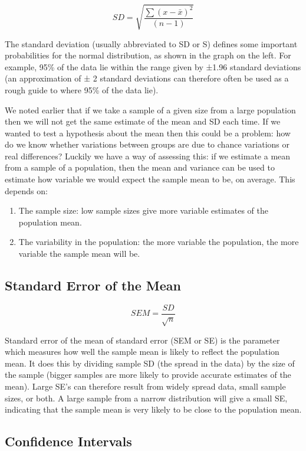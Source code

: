 \documentclass[
]{book}
\begin{document}
\[
SD= \sqrt{\frac{\sum (x - \bar x)^2}{(n-1)}} 
\]

The standard deviation (usually abbreviated to SD or S) defines some important probabilities for the normal distribution, as shown in the graph on the left. For example, 95\% of the data lie within the range given by ±1.96 standard deviations (an approximation of ± 2 standard deviations can therefore often be used as a rough guide to where 95\% of the data lie).

We noted earlier that if we take a sample of a given size from a large population then we will not get the same estimate of the mean and SD each time. If we wanted to test a hypothesis about the mean then this could be a problem: how do we know whether variations between groups are due to chance variations or real differences? Luckily we have a way of assessing this: if we estimate a mean from a sample of a population, then the mean and variance can be used to estimate how variable we would expect the sample mean to be, on average. This depends on:

\begin{enumerate}
\def\labelenumi{\arabic{enumi})}
\item
  The sample size: low sample sizes give more variable estimates of the population mean.
\item
  The variability in the population: the more variable the population, the
  more variable the sample mean will be.
\end{enumerate}

\subsection*{Standard Error of the Mean}\label{standard-error-of-the-mean}

\[
SEM = \frac{SD}{\sqrt{n}}
\]

Standard error of the mean of standard error (SEM or SE) is the parameter which measures how well the sample mean is likely to reflect the population mean. It does this by dividing sample SD (the spread in the data) by the size of the sample (bigger samples are more likely to provide accurate estimates of the mean). Large SE's can therefore result from widely spread data, small sample sizes, or both. A large sample from a narrow distribution will give a small SE, indicating that the sample mean is very likely to be close to the population mean.

\subsection*{Confidence Intervals}\label{confidence-intervals}
\end{document}
